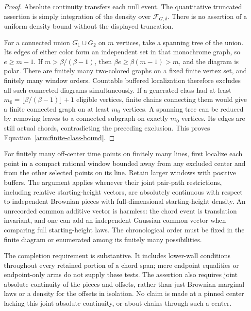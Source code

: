 \begin{proof}
Absolute continuity transfers each null event.  The quantitative
truncated assertion is simply integration of the density over
$\mathcal F_{G,\delta}$.  There is no assertion of a uniform density
bound without the displayed truncation.

For a connected union $G_1\cup G_2$ on $m$ vertices, take a spanning
tree of the union.  Its edges of either color form an independent set
in that monochrome graph, so $e\ge m-1$.  If
$m>\beta/(\beta-1)$, then
$\beta e\ge\beta(m-1)>m$, and the diagram is polar.
There are finitely many two-colored graphs on a fixed finite vertex
set, and finitely many window orders.  Countable buffered localization
therefore excludes all such connected diagrams simultaneously.
If a generated class had at least
$m_0=\lfloor\beta/(\beta-1)\rfloor+1$ eligible vertices, finite chains
connecting them would give a finite connected graph on at least
$m_0$ vertices.  A spanning tree can be reduced by removing leaves to
a connected subgraph on exactly $m_0$ vertices.  Its edges are still
actual chords, contradicting the preceding exclusion.  This proves
Equation~\eqref{arm:finite-class-bound}.
\end{proof}

\begin{remark}
\label{arm:finite-diagram-multiple-lines}
For finitely many off-center time points on finitely many lines, first
localize each point in a compact rational window bounded away from any
excluded center and from the other selected points on its line.  Retain
larger windows with positive buffers.  The argument applies whenever
their joint pair-path restrictions, including relative starting-height
vectors, are absolutely continuous with respect to independent
Brownian pieces with full-dimensional starting-height density.
An unrecorded common additive vector is harmless: the chord event is
translation invariant, and one can add an independent Gaussian common
vector when comparing full starting-height laws.  The chronological
order must be fixed in the finite diagram or enumerated among its
finitely many possibilities.

The completion requirement is substantive.  It includes lower-wall
conditions throughout every retained portion of a chord span; mere
endpoint equalities or endpoint-only arms do not supply these tests.
The assertion also requires joint absolute continuity of the pieces
and offsets, rather than just Brownian marginal laws or a density for
the offsets in isolation.  No claim is made at a pinned center lacking
this joint absolute continuity, or about chains through such a center.
\end{remark}
